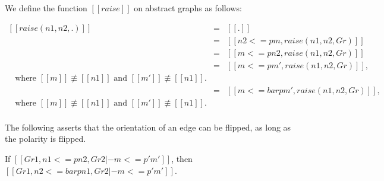 \begin{definition}
  \label{def:raise}
  We define the function $[[raise]]$ on abstract graphs as follows:
  \vspace{-10px}
  \begin{center}
    \begin{math}
      \begin{array}{lll}
        [[raise ( n1 , n2 , . )]] & = & [[.]]\\
        [[raise ( n1 , n2 , (n1 <=p  m, Gr))]] & = & [[n2 <=p m , raise (n1 , n2, Gr)]]\\
        [[raise ( n1 , n2 , ( m <=p n1, Gr))]] & = & [[m <= p n2 , raise (n1 , n2, Gr)]]\\
        [[raise ( n1 , n2 , (m <=p m' , Gr ))]] & = & [[m <=  p m' , raise (n1 , n2, Gr)]],\\
        \,\,\,\,\,\text{where } [[m]] \not\equiv [[n1]] \text{ and } [[m']] \not\equiv [[n1]].\\
        [[raise ( n1 , n2 , (m <=bar p m' , Gr ))]] & = &[[m <=  bar p m' , raise (n1 , n2, Gr)]],\\
        \,\,\,\,\,\text{where } [[m]] \not\equiv [[n1]] \text{ and } [[m']] \not\equiv [[n1]].\\
      \end{array}
    \end{math}
  \end{center}
\end{definition}
The following asserts that the orientation of an edge can be flipped,
as long as the polarity is flipped. 
\begin{lemma}[RelAssumFlip]
  \label{lemma:relassumflip}
  If $[[Gr1 , n1 <=p n2, Gr2 |- m <=p' m']]$, then \\ $[[Gr1 , n2 <=bar p n1, Gr2 |- m <=p' m']]$.
\end{lemma}
